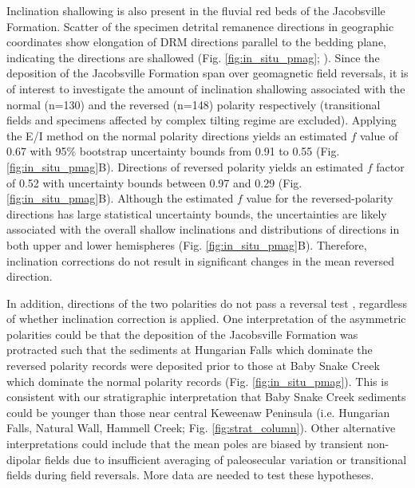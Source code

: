 \documentclass[draft]{agujournal2019}
\begin{document}
Inclination shallowing is also present in the fluvial red beds of the Jacobsville Formation. Scatter of the specimen detrital remanence directions in geographic coordinates show elongation of DRM directions parallel to the bedding plane, indicating the directions are shallowed (Fig. \ref{fig:in_situ_pmag}; ). Since the deposition of the Jacobsville Formation span over geomagnetic field reversals, it is of interest to investigate the amount of inclination shallowing associated with the normal (n=130) and the reversed (n=148) polarity respectively (transitional fields and specimens affected by complex tilting regime are excluded). Applying the E/I method on the normal polarity directions yields an estimated $f$ value of 0.67 with 95\% bootstrap uncertainty bounds from 0.91 to 0.55 (Fig. \ref{fig:in_situ_pmag}B). Directions of reversed polarity yields an estimated $f$ factor of 0.52 with uncertainty bounds between 0.97 and 0.29 (Fig. \ref{fig:in_situ_pmag}B). Although the estimated $f$ value for the reversed-polarity directions has large statistical uncertainty bounds, the uncertainties are likely associated with the overall shallow inclinations and distributions of directions in both upper and lower hemispheres (Fig. \ref{fig:in_situ_pmag}B). Therefore, inclination corrections do not result in significant changes in the mean reversed direction. 

In addition, directions of the two polarities do not pass a reversal test \cite{McFadden1990a, Tauxe2010a}, regardless of whether inclination correction is applied. One interpretation of the asymmetric polarities could be that the deposition of the Jacobsville Formation was protracted such that the sediments at Hungarian Falls which dominate the reversed polarity records were deposited prior to those at Baby Snake Creek which dominate the normal polarity records (Fig. \ref{fig:in_situ_pmag}). This is consistent with our stratigraphic interpretation that Baby Snake Creek sediments could be younger than those near central Keweenaw Peninsula (i.e. Hungarian Falls, Natural Wall, Hammell Creek; Fig. \ref{fig:strat_column}). Other alternative interpretations could include that the mean poles are biased by transient non-dipolar fields due to insufficient averaging of paleosecular variation or transitional fields during field reversals. More data are needed to test these hypotheses. 
\end{document}
